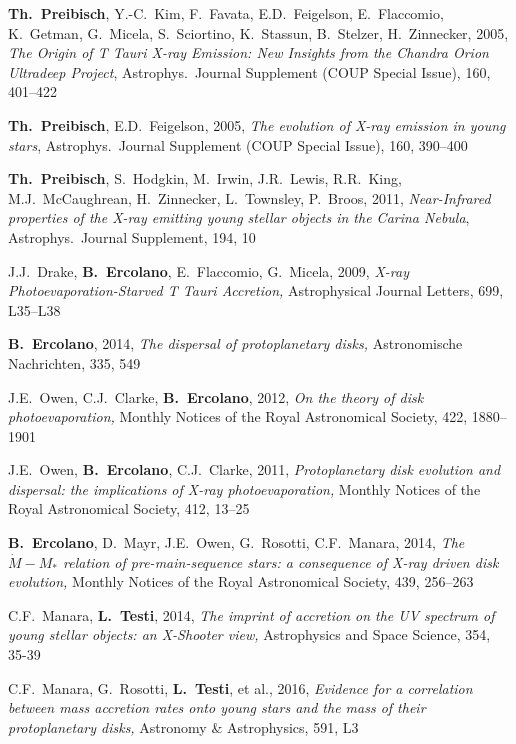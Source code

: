 \documentclass[10pt,fleqn,twoside,a4paper]{article}
\begin{document}
\begin{literature}
\item
\textbf{Th.~Preibisch}, Y.-C.~Kim, F.~Favata, E.D.~Feigelson, E.~Flaccomio,
K.~Getman, G.~Micela, S.~Sciortino, K.~Stassun, B.~Stelzer, H.~Zinnecker,
2005,
{\em The Origin of T Tauri X-ray Emission: New Insights from
the Chandra Orion Ultradeep Project}, Astrophys.~Journal Supplement
(COUP Special Issue), 160, 401--422
\item
\textbf{Th.~Preibisch}, E.D.~Feigelson, 2005,
{\em The evolution of X-ray emission in young stars},
Astrophys.~Journal Supplement (COUP Special Issue), 160, 390--400
\item
\textbf{Th.~Preibisch}, S.~Hodgkin, M.~Irwin, J.R.~Lewis, R.R.~King, M.J.~McCaughrean, H.~Zinnecker, L.~Townsley,
P.~Broos, 2011,
{\em Near-Infrared properties of the X-ray emitting young stellar objects in the
Carina Nebula}, Astrophys.~Journal Supplement, 194, 10
\item
J.J.~Drake,  \textbf{B.~Ercolano}, E.~Flaccomio, G.~Micela, 2009,
{\em X-ray Photoevaporation-Starved T Tauri Accretion,}
Astrophysical Journal Letters, 699,  L35--L38 
\item
\textbf{B.~Ercolano}, 2014,
{\em The dispersal of protoplanetary disks,}
	Astronomische Nachrichten, 335, 549
\item
J.E.~Owen, C.J.~Clarke, \textbf{B.~Ercolano}, 2012,
{\em On the theory of disk photoevaporation,}
Monthly Notices of the Royal Astronomical Society, 422, 1880--1901
\item
J.E.~Owen, \textbf{B.~Ercolano}, C.J.~Clarke, 2011,
{\em Protoplanetary disk evolution and dispersal: the implications of X-ray photoevaporation,}
Monthly Notices of the Royal Astronomical Society, 412, 13--25 
\item
\textbf{B.~Ercolano}, D.~Mayr, J.E.~Owen, G.~Rosotti, C.F.~Manara, 2014,
{\em The $\dot{M}-M_*$ relation of pre-main-sequence stars: a consequence of X-ray driven disk evolution,}
Monthly Notices of the Royal Astronomical Society, 439, 256--263 
\item
C.F.~Manara, \textbf{L.~Testi}, 2014,
{\em The imprint of accretion on the UV spectrum of young stellar objects: an X-Shooter view,}
Astrophysics and Space Science, 354, 35-39  
\item
C.F.~Manara, G.~Rosotti, \textbf{L.~Testi}, et al., 2016,
{\em Evidence for a correlation between mass accretion rates onto young stars and the mass of their protoplanetary disks,}
Astronomy \& Astrophysics, 591, L3
\end{literature}
\end{document}
